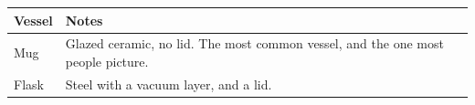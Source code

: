 \begin{tabularx}{\textwidth}{lX}
    \toprule
    Vessel & Notes \\
    \midrule
    Mug   & Glazed ceramic, no lid. The most common vessel, and the one
            most people picture. \\
    Flask & Steel with a vacuum layer, and a lid. \\
    \bottomrule
\end{tabularx}
